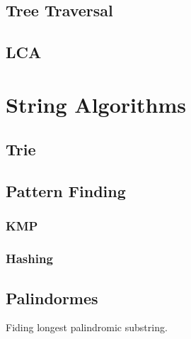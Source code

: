 \documentclass[13pt]{article}
\begin{document}
\subsection{Tree Traversal}\label{sub:tree_traversal} %


\subsection{LCA}\label{sub:lca} %


\section{String Algorithms}

\subsection{Trie}\label{sub:trie} %


\subsection{Pattern Finding}\label{sub:pattern_finding} %

\subsubsection{KMP}\label{ssub:kmp} %


\subsubsection{Hashing}\label{ssub:hashing} %




\subsection{Palindormes}\label{sub:pal} %
Fiding longest palindromic substring.

\end{document}

